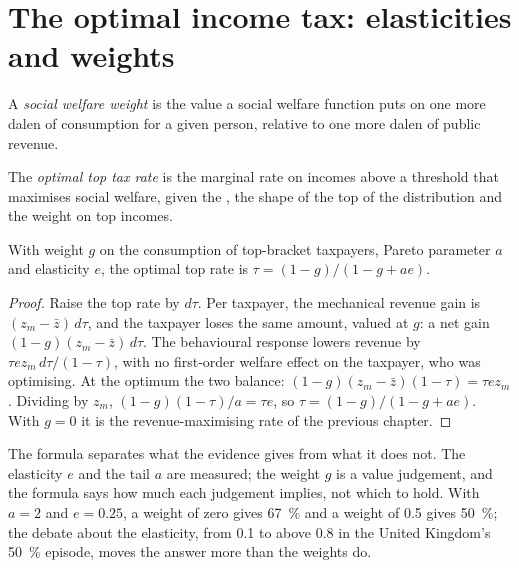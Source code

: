 \section{The optimal income tax: elasticities and weights}\label{sec:b3:transfers-and-incentives:optimal}

\begin{definition}\label{def:b3:transfers-and-incentives:weights}
A \emph{social welfare weight} is the value a social welfare function puts on one more
dalen of consumption for a given person, relative to one more dalen of public
revenue.
\end{definition}

\begin{definition}\label{def:b3:transfers-and-incentives:top-rate}
The \emph{optimal top tax rate} is the marginal rate on incomes above a threshold that
maximises social welfare, given the , the shape of the
top of the distribution and the weight on top incomes.
\end{definition}

\begin{proposition}\label{prop:b3:transfers-and-incentives:formula}
With weight $g$ on the consumption of top-bracket taxpayers, Pareto parameter $a$ and
elasticity $e$, the optimal top rate is $\tau = (1 - g)/(1 - g + ae)$.
\end{proposition}

\begin{proof}
Raise the top rate by $d\tau$. Per taxpayer, the mechanical revenue gain is $(z_m - \bar z)\,d\tau$, and
the taxpayer loses the same amount, valued at $g$: a net gain $(1 - g)(z_m - \bar z)\,d\tau$. The
behavioural response lowers revenue by $\tau ez_m\,d\tau/(1 - \tau)$, with no first-order welfare effect on
the taxpayer, who was optimising. At the optimum the two balance: $(1 - g)(z_m - \bar z)(1 - \tau) = \tau ez_m$.
Dividing by $z_m$, $(1 - g)(1 - \tau)/a = \tau e$, so $\tau = (1 - g)/(1 - g + ae)$. With $g = 0$ it is the revenue-maximising
rate of the previous chapter.
\end{proof}

The formula separates what the evidence gives from what it does not. The
elasticity $e$ and the tail $a$ are measured; the weight $g$ is a value judgement, and
the formula says how much each judgement implies, not which to hold. With $a = 2$
and $e = 0.25$, a weight of zero gives 67~\% and a weight of 0.5 gives 50~\%; the debate
about the elasticity, from 0.1 to above 0.8 in the United Kingdom's 50~\% episode,
moves the answer more than the weights do.

